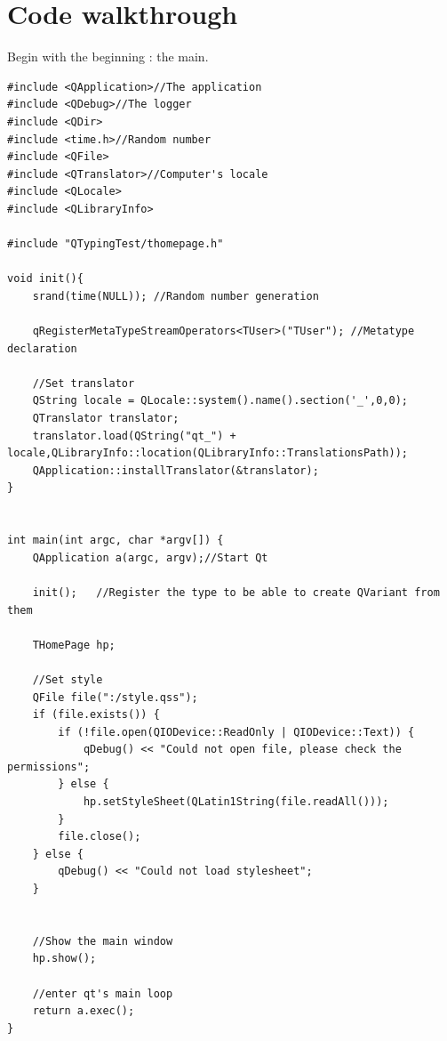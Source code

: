 \section{Code walkthrough}
Begin with the beginning : the main.
\begin{lstlisting}
#include <QApplication>//The application
#include <QDebug>//The logger
#include <QDir>
#include <time.h>//Random number 
#include <QFile>
#include <QTranslator>//Computer's locale
#include <QLocale>
#include <QLibraryInfo>

#include "QTypingTest/thomepage.h"

void init(){
    srand(time(NULL)); //Random number generation

    qRegisterMetaTypeStreamOperators<TUser>("TUser"); //Metatype declaration

    //Set translator
    QString locale = QLocale::system().name().section('_',0,0);
    QTranslator translator;
    translator.load(QString("qt_") + locale,QLibraryInfo::location(QLibraryInfo::TranslationsPath));
    QApplication::installTranslator(&translator);
}


int main(int argc, char *argv[]) {
    QApplication a(argc, argv);//Start Qt

    init();   //Register the type to be able to create QVariant from them

    THomePage hp;

    //Set style
    QFile file(":/style.qss");
    if (file.exists()) {
        if (!file.open(QIODevice::ReadOnly | QIODevice::Text)) {
            qDebug() << "Could not open file, please check the permissions";
        } else {
            hp.setStyleSheet(QLatin1String(file.readAll()));
        }
        file.close();
    } else {
        qDebug() << "Could not load stylesheet";
    }


	//Show the main window
    hp.show();

	//enter qt's main loop
    return a.exec();
}
\end{lstlisting}

